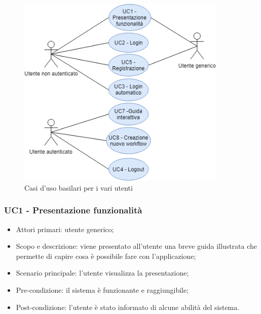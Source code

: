 \begin{figure}[H]
	\centering
	\includegraphics[width=10cm,keepaspectratio]{../includes/pics/azioni_attori.png}
	\caption{\label{fig:mission}Casi d'uso basilari per i vari utenti}
\end{figure}

\subsubsection{UC1 - Presentazione funzionalità}
\begin{itemize}
	\item  Attori primari: utente generico;
	\item  Scopo e descrizione: viene presentato all'utente una breve guida illustrata che permette di capire cosa è possibile fare con l'applicazione;
	\item  Scenario principale: l'utente visualizza la presentazione;
	\item  Pre-condizione: il sistema è funzionante e raggiungibile;
	\item  Post-condizione: l'utente è stato informato di alcune abilità del sistema.
\end{itemize}

